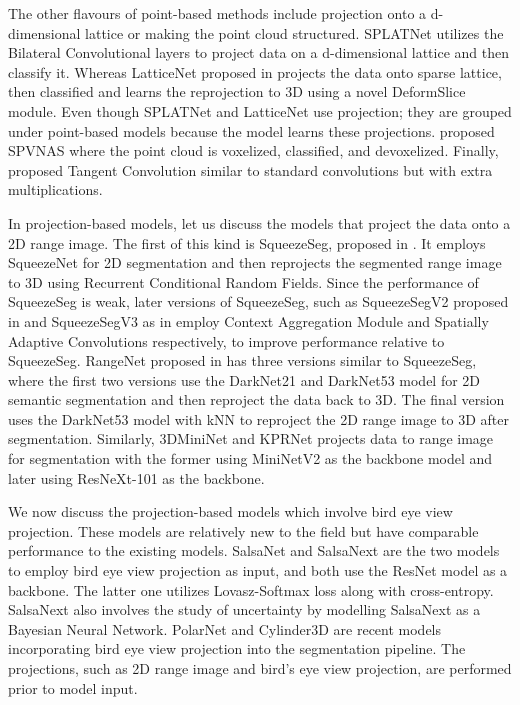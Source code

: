 The other flavours of point-based methods include projection onto a d-dimensional lattice or making the point cloud structured.
SPLATNet \cite{Su_2018_CVPR_splatnet} utilizes the Bilateral Convolutional layers to project data on a d-dimensional lattice and then classify it.
Whereas LatticeNet proposed in \cite{rosu2019latticenet} projects the data onto sparse lattice, then classified and learns the reprojection to 3D using a novel DeformSlice module.
Even though SPLATNet and LatticeNet use projection; they are grouped under point-based models because the model learns these projections.
\cite{spvnas} proposed SPVNAS where the point cloud is voxelized, classified, and devoxelized.
Finally, \cite{Tatarchenko_2018_CVPR_tangconv} proposed Tangent Convolution similar to standard convolutions but with extra multiplications.

In projection-based models, let us discuss the models that project the data onto a 2D range image.
The first of this kind is SqueezeSeg, proposed in \cite{Sequeseseg_2018}. It employs SqueezeNet for 2D segmentation and then reprojects the segmented range image to 3D using Recurrent Conditional Random Fields.
Since the performance of SqueezeSeg is weak, later versions of SqueezeSeg, such as SqueezeSegV2 proposed in \cite{SqueezeSegv2} and SqueezeSegV3 as in \cite{xu2020squeezesegv3} employ Context Aggregation Module and Spatially Adaptive Convolutions respectively, to improve performance relative to SqueezeSeg.
RangeNet proposed in \cite{Milioto2019} has three versions similar to SqueezeSeg, where the first two versions use the DarkNet21 and DarkNet53 model for 2D semantic segmentation and then reproject the data back to 3D.
The final version uses the DarkNet53 model with kNN to reproject the 2D range image to 3D after segmentation.
Similarly, 3DMiniNet \cite{3Dmininet} and KPRNet \cite{kochanov2020kprnet} projects data to range image for segmentation with the  former using MiniNetV2 as the backbone model and later using ResNeXt-101 as the backbone.

We now discuss the projection-based models which involve bird eye view projection.
These models are relatively new to the field but have comparable performance to the existing models.
SalsaNet \cite{salsanet2020} and SalsaNext \cite{SalsaNext_2020} are the two models to employ bird eye view projection as input, and both use the ResNet
model as a backbone.
The latter one utilizes Lovasz-Softmax loss along with cross-entropy.
SalsaNext also involves the study of uncertainty by modelling SalsaNext as a Bayesian Neural Network.
PolarNet \cite{polarnet} and Cylinder3D \cite{zhu2020cylindrical} are recent models incorporating bird eye view projection into the segmentation pipeline.
The projections, such as 2D range image and bird's eye view projection, are performed prior to model input.

